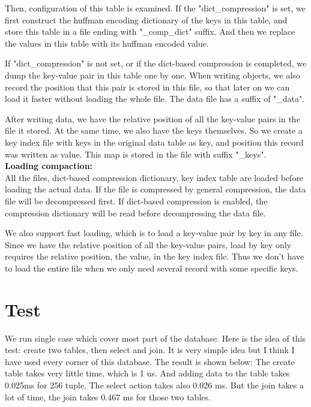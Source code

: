\documentclass[a4paper]{article}
\begin{document}
  Then, configuration of this table is examined. If the "dict\_compression" is set, we first construct the huffman encoding dictionary of the keys in this table, and store this table in a file ending with "\_comp\_dict" suffix. And then we replace the values in this table with its huffman encoded value.

  If "dict\_compression" is not set, or if the dict-based compression is completed, we dump the key-value pair in this table one by one. When writing objects, we also record the position that this pair is stored in this file, so that later on we can load it faster without loading the whole file. The data file has a suffix of "\_data".

  After writing data, we have the relative position of all the key-value pairs in the file it stored. At the same time, we also have the keys themselves. So we create a key index file with keys in the original data table as key, and position this record was written as value. This map is stored in the file with suffix "\_keys".\\

  \textbf{Loading compaction:}\\

  All the files, dict-based compression dictionary, key index table are loaded before loading the actual data. If the file is compressed by general compression, the data file will be decompressed first. If dict-based compression is enabled, the compression dictionary will be read before decompressing the data file.

  We also support fast loading, which is to load a key-value pair by key in any file. Since we have the relative position of all the key-value pairs, load by key only requires the relative position, the value, in the key index file. Thus we don't have to load the entire file when we only need several record with some specific keys.


\section{Test}
We run single case which cover most part of the database. Here is the idea of this test: create two tables, then select and join.
It is very simple idea but I think I have used every corner of this database.
The result is shown below:
The create table takes very little time, which is 1 us. And adding data to the table takes 0.025ms for 256 tuple. The select action takes also 0.026 ms. But the join takes a lot of time, the join takes 0.467 ms for those two tables.
\end{document}
